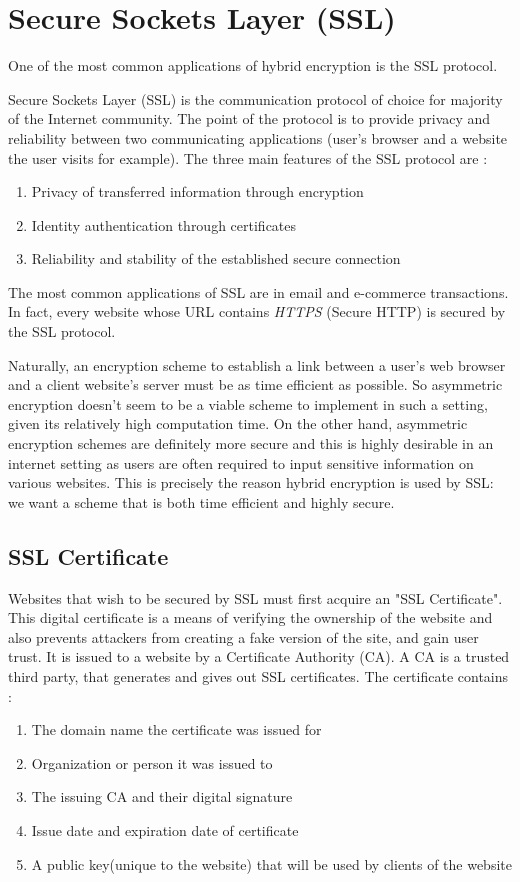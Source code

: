 \section{Secure Sockets Layer (SSL)}
One of the most common applications of hybrid encryption is the SSL protocol.

Secure Sockets Layer (SSL) is the communication protocol of choice for majority of the Internet community. 
The point of the protocol is to provide privacy and reliability between two communicating applications (user's browser and a website the user visits for example). 
The three main features of the SSL protocol are \cite{mckinley}:

\begin{enumerate}
    \item Privacy of transferred information through encryption
    \item Identity authentication through certificates
    \item Reliability and stability of the established secure connection
\end{enumerate}

The most common applications of SSL are in email and e-commerce transactions. 
In fact, every website whose URL contains \emph{HTTPS} (Secure HTTP) is secured by the SSL protocol.

Naturally, an encryption scheme to establish a link between a user's web browser and a client website's server must be as time efficient as possible. 
So asymmetric encryption doesn't seem to be a viable scheme to implement in such a setting, given its relatively high computation time. 
On the other hand, asymmetric encryption schemes are definitely more secure and this is highly desirable in an internet setting as users are often required to input sensitive information on various websites. 
This is precisely the reason hybrid encryption is used by SSL: we want a scheme that is both time efficient and highly secure.

\subsection{SSL Certificate} 
Websites that wish to be secured by SSL must first acquire an "SSL Certificate". 
This digital certificate is a means of verifying the ownership of the website and also prevents attackers from creating a fake version of the site, and gain user trust. 
It is issued to a website by a Certificate Authority (CA). 
A CA is a trusted third party, that generates and gives out SSL certificates. The certificate contains \cite{cloudflare_certificate}:
\begin{enumerate}
    \item The domain name the certificate was issued for
    \item Organization or person it was issued to
    \item The issuing CA and their digital signature
    \item Issue date and expiration date of certificate
    \item A public key(unique to the website) that will be used by clients of the website
\end{enumerate}

